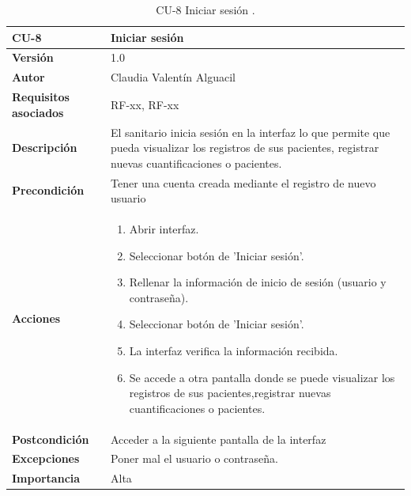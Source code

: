 \begin{table}[p]
	\centering
	\begin{tabularx}{\linewidth}{ p{} p{} }
		\toprule
		\textbf{CU-8}    & \textbf{Iniciar sesión }\\
		\toprule
		\textbf{Versión}              & 1.0    \\
		\textbf{Autor}                & Claudia Valentín Alguacil \\
		\textbf{Requisitos asociados} & RF-xx, RF-xx \\
		\textbf{Descripción}          & El sanitario inicia sesión en la interfaz lo que permite que pueda visualizar los registros de sus pacientes, registrar nuevas cuantificaciones o pacientes. \\
		\textbf{Precondición}         & Tener una cuenta creada mediante el registro de nuevo usuario \\
		\textbf{Acciones}             &
		\begin{enumerate}
			\def\labelenumi{\arabic{enumi}.}
			\tightlist
                \item Abrir interfaz.
			\item Seleccionar botón de 'Iniciar sesión'.
                \item Rellenar la información de inicio de           sesión (usuario y contraseña).
                \item Seleccionar botón de 'Iniciar sesión'.
			\item La interfaz verifica la información recibida.
                \item Se accede a otra pantalla donde se puede visualizar los registros de sus pacientes,registrar nuevas cuantificaciones o pacientes.
		\end{enumerate}\\
		\textbf{Postcondición}    &  Acceder a la siguiente pantalla de la interfaz\\
		\textbf{Excepciones}  & Poner mal el usuario o contraseña. \\
		\textbf{Importancia} & Alta \\
		\bottomrule
	\end{tabularx}
	\caption{CU-8 Iniciar sesión .}
\end{table}

